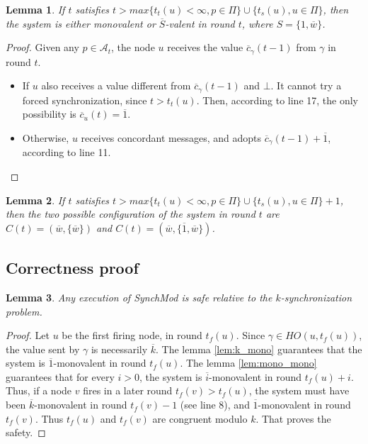 \documentclass{article}
\newtheorem{lemma}{Lemma}[section]
\newcommand{\cent}{\gamma}
\newcommand{\ts}{t_{s}}
\newcommand{\tf}{t_{f}}
\newcommand{\try}{t_{t}}
\begin{document}
\begin{lemma}\label{lem:mono_bi}
	If $t$ satisfies $t > max \{\try(u) < \infty, p \in \Pi\} \cup \{\ts(u), u \in \Pi\}$,
	then the system is either monovalent or $\overline{S}$-valent in round $t$, where $S = \{1, \overline{w}\}$.
\end{lemma}
\begin{proof}
	Given any $p \in \mathcal{A}_t$, the node $u$ receives the value $\overline{c}_\cent(t-1)$ from $\cent$ in round $t$.
	\begin{itemize}
		\item If $u$ also receives a value different from $\overline{c}_\cent(t-1)$ and $\bot$.
			It cannot try a forced synchronization, since $t > \try(u)$.
			Then, according to line 17, the only possibility is $\overline{c}_u(t) = \overline{1}$.
		\item Otherwise, $u$ receives concordant messages, and adopts $\overline{c}_\cent(t-1)+\overline{1}$, according to line 11.
	\end{itemize}
\end{proof}

\begin{lemma}\label{lem:mono_bi}
	If $t$ satisfies $t > max \{\try(u) < \infty, p \in \Pi\} \cup \{\ts(u), u \in \Pi\}+1$,
	then the two possible configuration of the system in round $t$ are $C(t) = (\overline{w}, \{\overline{w}\})$ and $C(t) = (\overline{w}, \{\overline{1}, \overline{w}\})$.
\end{lemma}

\subsection{Correctness proof}
\begin{lemma}\label{lem:saf}
	Any execution of SynchMod is safe relative to the $k$-synchronization problem.
\end{lemma}
\begin{proof}
	Let $u$ be the first firing node, in round $\tf(u)$.
	Since $\cent \in HO(u,\tf(u))$, the value sent by $\cent$ is necessarily $\overline{k}$.
	The lemma \ref{lem:k_mono} guarantees that the system is $\overline{1}$-monovalent in round $\tf(u)$.
	The lemma \ref{lem:mono_mono} guarantees that for every $i > 0$, the system is $\overline{i}$-monovalent in round $\tf(u)+i$.
	Thus, if a node $v$ fires in a later round $\tf(v) > \tf(u)$, the system must have been $\overline{k}$-monovalent in round $\tf(v)-1$ (see line 8),
	and $\overline{1}$-monovalent in round $\tf(v)$. Thus $\tf(u)$ and $\tf(v)$ are congruent modulo $k$.
	That proves the safety.
\end{proof}
\end{document}
